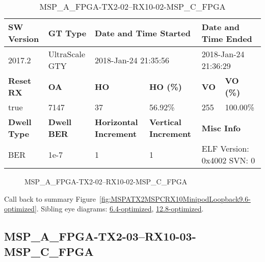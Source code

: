 \begin{table}[h]
\centering
\caption{MSP\_A\_FPGA-TX2-02--RX10-02-MSP\_C\_FPGA}
\label{tab:MSPAFPGATX202RX1002MSPCFPGA9.6-optimized}
\begin{tabular}{@{}|l|l|l|l|l|l|@{}}
\toprule
\textbf{SW Version}                & \textbf{GT Type}   & \multicolumn{2}{l|}{\textbf{Date and Time Started}}            & \multicolumn{2}{l|}{\textbf{Date and Time Ended}}        \\ \midrule
2017.2                       & UltraScale GTY          & \multicolumn{2}{l|}{2018-Jan-24 21:35:56}                   & \multicolumn{2}{l|}{2018-Jan-24 21:36:29}               \\ \midrule
\textbf{Reset RX}                  & \textbf{OA} & \textbf{HO}   & \textbf{HO (\%)} & \textbf{VO} & \textbf{VO (\%)} \\ \midrule
true & 7147        & 37          & 56.92\%        & 255        & 100.00\%       \\ \midrule
\textbf{Dwell Type}                & \textbf{Dwell BER} & \textbf{Horizontal Increment} & \textbf{Vertical Increment}    & \multicolumn{2}{l|}{\textbf{Misc Info}}                  \\ \midrule
BER                            & 1e-7        & 1        & 1           & \multicolumn{2}{l|}{ELF Version: 0x4002 SVN: 0}                         \\ \bottomrule
\end{tabular}
\end{table}

\begin{figure}[h]
\caption{MSP\_A\_FPGA-TX2-02--RX10-02-MSP\_C\_FPGA} \label{fig:MSPAFPGATX202RX1002MSPCFPGA9.6-optimized}
\end{figure}

Call back to summary Figure~\ref{fig:MSPATX2MSPCRX10MinipodLoopback9.6-optimized}.
Sibling eye diagrams: \hyperref[sec:MSPAFPGATX202RX1002MSPCFPGA6.4-optimized]{6.4-optimized}, \hyperref[sec:MSPAFPGATX202RX1002MSPCFPGA12.8-optimized]{12.8-optimized}.

\clearpage
\newpage


\subsection{MSP\_A\_FPGA-TX2-03--RX10-03-MSP\_C\_FPGA}\label{sec:MSPAFPGATX203RX1003MSPCFPGA9.6-optimized}

